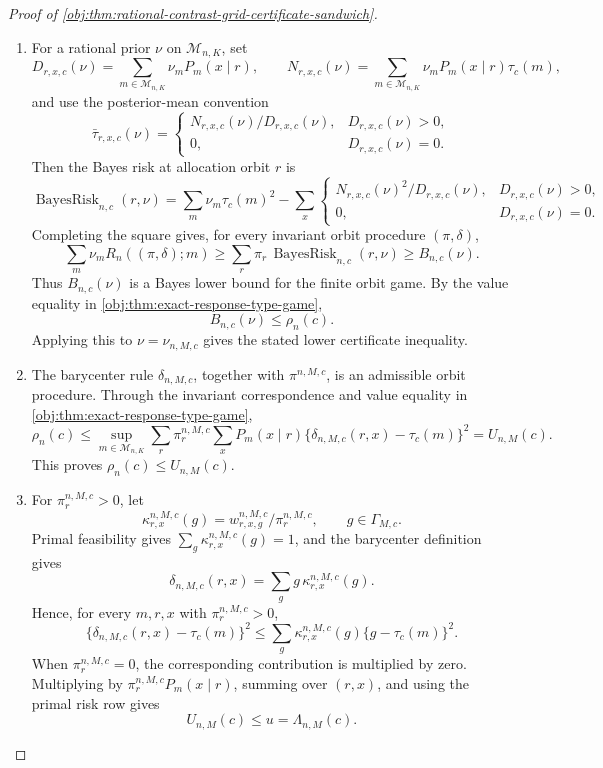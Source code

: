 \begin{proof}[Proof of \cref{obj:thm:rational-contrast-grid-certificate-sandwich}]
\begin{enumerate}
\item For a rational prior \(\nu\) on \(\mathcal M_{n,K}\), set
\[
D_{r,x,c}(\nu)
=
\sum_{m\in\mathcal M_{n,K}}\nu_m P_m(x\mid r),
\qquad
N_{r,x,c}(\nu)
=
\sum_{m\in\mathcal M_{n,K}}\nu_m P_m(x\mid r)\tau_c(m),
\]
and use the posterior-mean convention
\[
\bar\tau_{r,x,c}(\nu)=
\begin{cases}
N_{r,x,c}(\nu)/D_{r,x,c}(\nu),&D_{r,x,c}(\nu)>0,\\
0,&D_{r,x,c}(\nu)=0.
\end{cases}
\]
Then the Bayes risk at allocation orbit \(r\) is
\[
\operatorname{BayesRisk}_{n,c}(r,\nu)
=
\sum_m\nu_m\tau_c(m)^2
-
\sum_x
\begin{cases}
N_{r,x,c}(\nu)^2/D_{r,x,c}(\nu),&D_{r,x,c}(\nu)>0,\\
0,&D_{r,x,c}(\nu)=0.
\end{cases}
\]
Completing the square gives, for every invariant orbit procedure \((\pi,\delta)\),
\[
\sum_m\nu_m R_n((\pi,\delta);m)
\geq
\sum_r\pi_r\,\operatorname{BayesRisk}_{n,c}(r,\nu)
\geq
B_{n,c}(\nu).
\]
Thus \(B_{n,c}(\nu)\) is a Bayes lower bound for the finite orbit game.  By the value equality in \cref{obj:thm:exact-response-type-game},
\[
B_{n,c}(\nu)\leq \rho_n(c).
\]
Applying this to \(\nu=\nu_{n,M,c}\) gives the stated lower certificate inequality. %

\item The barycenter rule \(\delta_{n,M,c}\), together with \(\pi^{n,M,c}\), is an admissible orbit procedure.  Through the invariant correspondence and value equality in \cref{obj:thm:exact-response-type-game},
\[
\rho_n(c)
\leq
\sup_{m\in\mathcal M_{n,K}}
\sum_r \pi_r^{n,M,c}
\sum_x P_m(x\mid r)
\{\delta_{n,M,c}(r,x)-\tau_c(m)\}^2
=
U_{n,M}(c).
\]
This proves \(\rho_n(c)\leq U_{n,M}(c)\). %

\item For \(\pi_r^{n,M,c}>0\), let
\[
\kappa_{r,x}^{n,M,c}(g)
=
w_{r,x,g}^{n,M,c}/\pi_r^{n,M,c},
\qquad g\in\Gamma_{M,c}.
\]
Primal feasibility gives \(\sum_g\kappa_{r,x}^{n,M,c}(g)=1\), and the barycenter definition gives
\[
\delta_{n,M,c}(r,x)
=
\sum_g g\,\kappa_{r,x}^{n,M,c}(g).
\]
Hence, for every \(m,r,x\) with \(\pi_r^{n,M,c}>0\),
\[
\{\delta_{n,M,c}(r,x)-\tau_c(m)\}^2
\leq
\sum_g\kappa_{r,x}^{n,M,c}(g)\{g-\tau_c(m)\}^2.
\]
When \(\pi_r^{n,M,c}=0\), the corresponding contribution is multiplied by zero.  Multiplying by \(\pi_r^{n,M,c}P_m(x\mid r)\), summing over \((r,x)\), and using the primal risk row gives
\[
U_{n,M}(c)\leq u=\Lambda_{n,M}(c).
\]


\end{enumerate}
\end{proof}
